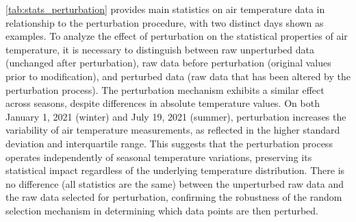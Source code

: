 \documentclass[authoryear,preprint,review,12pt]{elsarticle}
\newcommand{\statusblock}[3]{
    \ifthenelse{\equal{#2}{todo}}
        {\textcolor{red}{#1 (TO DO): #3}}
        {}
    \ifthenelse{\equal{#2}{wip}}
        {\textcolor{magenta}{#1 (IN PROGRESS): #3}}
        {}
    \ifthenelse{\equal{#2}{update}}
        {\textcolor{blue}{#1 (UPDATE): #3}}
        {}
    \ifthenelse{\equal{#2}{review}}
        {\textcolor{cyan}{#1 (REVIEW): #3}}
        {}
    \ifthenelse{\equal{#2}{done}}
        {\textcolor{PineGreen}{#1 (READY): #3}}
        {}
}
\begin{document}
\cref{tab:stats_perturbation} provides main statistics on air temperature data in relationship to the perturbation procedure, with two distinct days shown as examples.
To analyze the effect of perturbation on the statistical properties of air temperature, it is necessary to distinguish between raw unperturbed data (unchanged after perturbation), raw data before perturbation (original values prior to modification), and perturbed data (raw data that has been altered by the perturbation process).
The perturbation mechanism exhibits a similar effect across seasons, despite differences in absolute temperature values. On both January 1, 2021 (winter) and July 19, 2021 (summer), perturbation increases the variability of air temperature measurements, as reflected in the higher standard deviation and interquartile range. This suggests that the perturbation process operates independently of seasonal temperature variations, preserving its statistical impact regardless of the underlying temperature distribution.
There is no difference (all statistics are the same) between the unperturbed raw data and the raw data selected for perturbation, confirming the robustness of the random selection mechanism in determining which data points are then perturbed.
\end{document}
